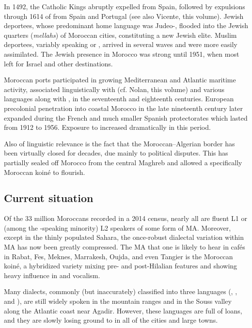 \documentclass[output=paper]{langsci/langscibook}
\begin{document}
In 1492, the Catholic Kings abruptly expelled   from Spain, followed by expulsions through 1614 of  from Spain and Portugal (see also Vicente, this volume). Jewish deportees, whose predominant home language was Judeo-, flooded into the Jewish quarters (\textit{mellahs}) of Moroccan cities, constituting a new Jewish elite. Muslim deportees, variably speaking  or , arrived in several waves and were more easily assimilated. The Jewish presence in Morocco was strong until 1951, when most  left for Israel and other destinations.

Moroccan ports participated in growing Mediterranean and Atlantic maritime activity, associated linguistically with  (cf. Nolan, this volume) and various  languages along with , in the seventeenth and eighteenth centuries. European precolonial penetration into coastal Morocco in the late nineteenth century later expanded during the French and much smaller {Spanish} protectorates which lasted from 1912 to 1956. Exposure to  increased dramatically in this period. 

Also of linguistic relevance is the fact that the Moroccan–Algerian border has been virtually closed for decades, due mainly to political disputes. This has partially sealed off Morocco from the central Maghreb and allowed a specifically Moroccan koiné to flourish.

\subsection{Current situation}

Of the 33 million Moroccans recorded in a 2014 census, nearly all are fluent L1 or (among the -speaking minority) L2 speakers of some form of MA. Moreover, except in the thinly populated  Sahara, the once-robust dialectal variation within MA has now been greatly compressed. The MA that one is likely to hear in cafés in Rabat, Fes, Meknes, Marrakesh, Oujda, and even Tangier is the Moroccan koiné, a hybridized variety mixing pre- and post-Hilalian features and showing heavy  influence in  and vocalism.

Many  dialects, commonly (but inaccurately) classified into three languages (, , and ), are still widely spoken in the mountain ranges and in the Souss valley along the Atlantic coast near Agadir. However, these  languages are full of  loans, and they are slowly losing ground to  in all of the cities and large towns.
\end{document}
